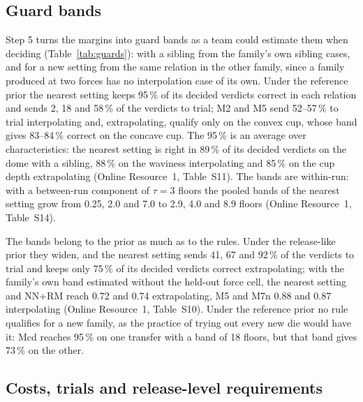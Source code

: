 \documentclass[pdflatex,sn-basic,lineno]{sn-jnl}
\newcommand{\ORt}[1]{Online Resource~1, Table~S#1}
\begin{document}
\subsection{Guard bands}\label{sec:res-procedure}

Step 5 turns the margins into guard bands as a team could estimate them when deciding (Table~\ref{tab:guards}): with a sibling from the family's own sibling cases, and for a new setting from the same relation in the other family, since a family produced at two forces has no interpolation case of its own. Under the reference prior the nearest setting keeps 95\,\% of its decided verdicts correct in each relation and sends 2, 18 and 58\,\% of the verdicts to trial; M2 and M5 send 52--57\,\% to trial interpolating and, extrapolating, qualify only on the convex cup, whose band gives 83--84\,\% correct on the concave cup. The 95\,\% is an average over characteristics: the nearest setting is right in 89\,\% of its decided verdicts on the dome with a sibling, 88\,\% on the waviness interpolating and 85\,\% on the cup depth extrapolating (\ORt{11}). The bands are within-run: with a between-run component of $\tau=3$ floors the pooled bands of the nearest setting grow from 0.25, 2.0 and 7.0 to 2.9, 4.0 and 8.9 floors (\ORt{14}).

The bands belong to the prior as much as to the rules. Under the release-like prior they widen, and the nearest setting sends 41, 67 and 92\,\% of the verdicts to trial and keeps only 75\,\% of its decided verdicts correct extrapolating; with the family's own band estimated without the held-out force cell, the nearest setting and NN+RM reach 0.72 and 0.74 extrapolating, M5 and M7n 0.88 and 0.87 interpolating (\ORt{10}). Under the reference prior no rule qualifies for a new family, as the practice of trying out every new die would have it: Mcd reaches 95\,\% on one transfer with a band of 18 floors, but that band gives 73\,\% on the other.

\subsection{Costs, trials and release-level requirements}\label{sec:res-costs}
\end{document}
